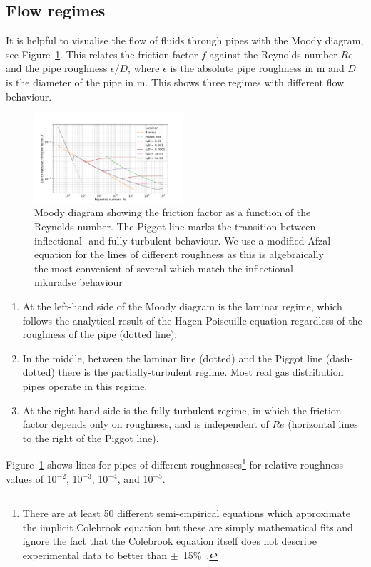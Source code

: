 \documentclass[5p]{elsarticle} %
\begin{document}
\subsection{Flow regimes}

It is helpful to visualise the flow of fluids through pipes with the Moody diagram, see Figure~\ref{fig:moody}. 
This relates the friction factor $f$ against the Reynolds number $Re$ and the pipe roughness $\epsilon/D$, where $\epsilon$ is the absolute pipe roughness in m and $D$ is the diameter of the pipe in m. 
This shows three regimes with different flow behaviour.

\begin{figure}[ht]
\centering
\includegraphics[width=0.49\textwidth]{moody_afzal.png}
\caption{Moody diagram showing the friction factor as a function of the Reynolds number. The Piggot line
marks the transition between inflectional- and fully-turbulent behaviour\citep{Moody1944}. We use a modified Afzal equation\citep{Cerbus2018}  for the lines of different roughness as this is algebraically the most convenient of several which match the inflectional nikuradse behaviour\citep{Allen2007,Goldenfeld2006}}
\label{fig:moody}
\end{figure}

\begin{enumerate}
    \item At the left-hand side of the Moody diagram is the laminar regime, which follows the analytical result of the Hagen-Poiseuille equation regardless of the roughness of the pipe (dotted line). 
    \item In the middle, between the laminar line (dotted) and the Piggot line (dash-dotted) there is the partially-turbulent regime. Most real gas distribution pipes operate in this regime.
    \item At the right-hand side is the fully-turbulent regime, in which the friction factor depends only on roughness, and is independent of $Re$ (horizontal lines to the right of the Piggot line).
\end{enumerate}

Figure~\ref{fig:moody} shows lines for pipes of different 
roughnesses\footnote{There are at least 50 different semi-empirical equations which approximate the implicit Colebrook equation but these are simply mathematical fits and ignore the fact that  the Colebrook equation itself does not describe experimental data to better than $\pm$~15\%~\cite{Allen2007, Cerbus2018, She2012}.  
} 
 for relative roughness values of 10$^{-2}$, 10$^{-3}$, 10$^{-4}$, and 10$^{-5}$. 
\end{document}

